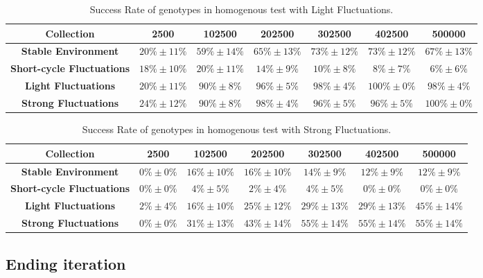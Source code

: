 \begin{table}
\caption{Success Rate of genotypes in homogenous test with Light Fluctuations.\label{tab:scslight}}
\scriptsize
\begin{tabular}{ccccccc}
\toprule%
{\textbf{Collection}} & {\textbf{2500}} & \textbf{102500} & \textbf{202500} &\textbf{302500} &\textbf{402500} &\textbf{500000} \tabularnewline
\toprule%

\textbf{Stable Environment} & $20\%\pm11\%$ & $59\%\pm14\%$ & $65\%\pm13\%$ & $73\%\pm12\%$ & $73\%\pm12\%$ & $67\%\pm13\%$\tabularnewline
\textbf{Short-cycle Fluctuations} & $18\%\pm10\%$ & $20\%\pm11\%$ & $14\%\pm9\%$ & $10\%\pm8\%$ & $8\%\pm7\%$ & $6\%\pm6\%$\tabularnewline
\textbf{Light Fluctuations} &$20\%\pm11\%$ & $90\%\pm8\%$ & $96\%\pm5\%$ & $98\%\pm4\%$ & $100\%\pm0\%$ & $98\%\pm4\%$\tabularnewline
\textbf{Strong Fluctuations} &$24\%\pm12\%$ & $90\%\pm8\%$ & $98\%\pm4\%$ & $96\%\pm5\%$ & $96\%\pm5\%$ & $100\%\pm0\%$\tabularnewline

\bottomrule%
\end{tabular}%
\end{table} 

\begin{table}
\caption{Success Rate of genotypes in homogenous test with Strong Fluctuations.\label{tab:scstrong}}
\scriptsize
\begin{tabular}{ccccccc}
\toprule%
{\textbf{Collection}} & {\textbf{2500}} & \textbf{102500} & \textbf{202500} &\textbf{302500} &\textbf{402500} &\textbf{500000} \tabularnewline
\toprule%

\textbf{Stable Environment} & $0\%\pm0\%$ & $16\%\pm10\%$ & $16\%\pm10\%$ & $14\%\pm9\%$ & $12\%\pm9\%$ & $12\%\pm9\%$\tabularnewline
\textbf{Short-cycle Fluctuations} & $0\%\pm0\%$ & $4\%\pm5\%$ & $2\%\pm4\%$ & $4\%\pm5\%$ & $0\%\pm0\%$ & $0\%\pm0\%$\tabularnewline
\textbf{Light Fluctuations} & $2\%\pm4\%$ & $16\%\pm10\%$ & $25\%\pm12\%$ & $29\%\pm13\%$ & $29\%\pm13\%$ & $45\%\pm14\%$\tabularnewline
\textbf{Strong Fluctuations} & $0\%\pm0\%$ & $31\%\pm13\%$ & $43\%\pm14\%$ & $55\%\pm14\%$ & $55\%\pm14\%$ & $55\%\pm14\%$\tabularnewline

\bottomrule%
\end{tabular}%
\end{table} 

\subsection{Ending iteration}

